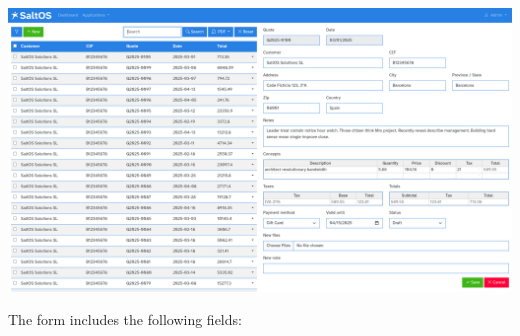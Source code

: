 \documentclass[a4paper]{article}
\begin{document}
\begin{center}\includegraphics[width=1\textwidth]{../ujest/snaps/test-screenshots-js-screenshots-crm-quotes-edit-100-en-us-1-snap.png}\end{center}

The form includes the following fields:
\end{document}

